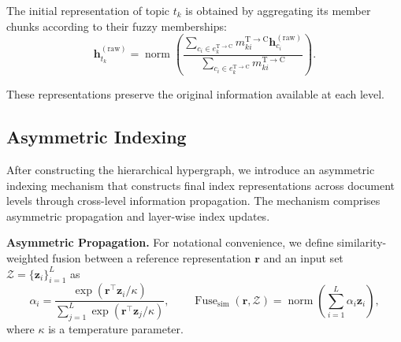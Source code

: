 \documentclass{article} %
\begin{document}
The initial representation of topic $t_k$ is obtained by aggregating its member chunks according to their fuzzy memberships:
\begin{equation}
\mathbf{h}_{t_k}^{(\mathrm{raw})}
=
\operatorname{norm}\!\left(
\frac{
\sum_{c_i\in e_k^{\mathrm{T}\to\mathrm{C}}}
m_{ki}^{\mathrm{T}\to\mathrm{C}}\mathbf{h}_{c_i}^{(\mathrm{raw})}
}{
\sum_{c_i\in e_k^{\mathrm{T}\to\mathrm{C}}}m_{ki}^{\mathrm{T}\to\mathrm{C}}
}
\right).
\label{eq:topic_raw_representation}
\end{equation}

These representations preserve the original information available at each level.

\subsection{Asymmetric Indexing}

After constructing the hierarchical hypergraph, we introduce an asymmetric indexing mechanism that constructs final index representations across document levels through cross-level information propagation. The mechanism comprises asymmetric propagation and layer-wise
index updates.

\smallskip
\noindent\textbf{Asymmetric Propagation.}
For notational convenience, we define similarity-weighted fusion between a reference representation $\mathbf{r}$ and an input set $\mathcal{Z}=\{\mathbf{z}_i\}_{i=1}^{L}$ as
\begin{equation}
\alpha_i =
\frac{\exp(\mathbf{r}^{\top}\mathbf{z}_i/\kappa)}
{\sum_{j=1}^{L}\exp(\mathbf{r}^{\top}\mathbf{z}_j/\kappa)},
\qquad
\operatorname{Fuse}_{\mathrm{sim}}(\mathbf{r},\mathcal{Z})
=
\operatorname{norm}\!\left(
\sum_{i=1}^{L}\alpha_i\mathbf{z}_i
\right),
\label{eq:similarity_weighted_fusion}
\end{equation}
where $\kappa$ is a temperature parameter.
\end{document}

